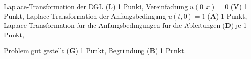\begin{bewertung}
\begin{teilaufgaben}
\item
Laplace-Transformation der DGL ({\bf L}) 1 Punkt,
Vereinfachung $u(0,x)=0$ ({\bf V}) 1 Punkt,
Laplace-Transformation der Anfangsbedingung $u(t,0)=1$ ({\bf A}) 1 Punkt,
Laplace-Transformation für die Anfangsbedingungen für die Ableitungen
({\bf D}) je 1 Punkt,
\item
Problem gut gestellt ({\bf G}) 1 Punkt,
Begründung ({\bf B}) 1 Punkt.
\end{teilaufgaben}
\end{bewertung}
